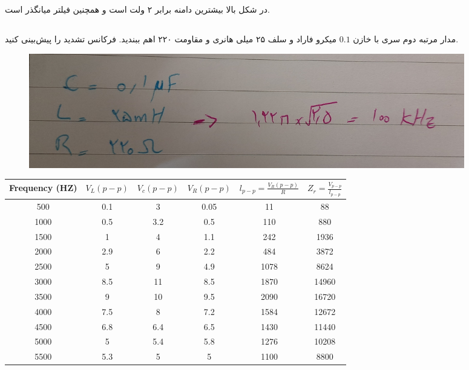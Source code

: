 \documentclass[12pt]{article}
\begin{document}
در شکل بالا بیشترین دامنه برابر ۲ ولت است و همچنین فیلتر میانگذر است.

\clearpage
\subsection{}
مدار مرتبه دوم سری با خازن $0.1$ میکرو فاراد و سلف ۲۵ میلی هانری و مقاومت ۲۲۰ اهم ببندید. فرکانس تشدید را پیش‌بینی کنید.



\begin{figure}[H]
\begin{center}
\includegraphics[width=\textwidth, height=5cm]{./images/6.5.a}
\end{center}
\end{figure}

\begin{latin}
\begin{table}[H]
\begin{adjustbox}{width=\textwidth}
\begin{tabular}{|c|c|c|c|c|c|}
\hline
Frequency (HZ) & 
$V_L(p - p)$ & 
$V_c(p - p)$ & 
$V_R(p - p)$ & 
$l_{p - p} = \frac{V_R(p - p)}{R}$ & 
$Z_r = \frac{V_{p - p}}{l_{p - p}}$ \\
\hline
\hline
500 & 0.1 & 3 & 0.05 & 11 & 88 \\
\hline
1000 & 0.5 & 3.2 & 0.5 & 110 & 880 \\
\hline
1500 & 1 & 4 & 1.1 & 242 & 1936 \\
\hline
2000 & 2.9 & 6 & 2.2 & 484 & 3872 \\
\hline
2500 & 5 & 9 & 4.9 & 1078 & 8624 \\
\hline
3000 & 8.5 & 11 & 8.5 & 1870 & 14960 \\
\hline
3500 & 9 & 10 & 9.5 & 2090 & 16720 \\
\hline
4000 & 7.5 & 8 & 7.2 & 1584 & 12672 \\
\hline
4500 & 6.8 & 6.4 & 6.5 & 1430 & 11440 \\
\hline
5000 & 5 & 5.4 & 5.8 & 1276 & 10208 \\
\hline
5500 & 5.3 & 5 & 5 & 1100 & 8800 \\
\hline
\end{tabular}
\end{adjustbox}
\end{table}
\end{latin}
\end{document}
